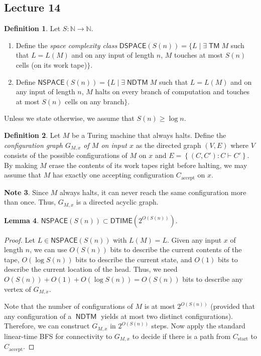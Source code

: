\documentclass[10pt,letterpaper,cm]{nupset}
\theoremstyle{definition}
\newtheorem{definition}{Definition}[subsection]
\newtheorem{note}[definition]{Note}
\theoremstyle{theorem}
\newtheorem{lemma}[definition]{Lemma}
\theoremstyle{remark}
\newcommand{\N}{\mathbb N}
\newcommand{\1}{\mathbf{1}}
\newcommand{\0}{\vec 0}
\DeclareMathOperator{\TM}{\mathsf{TM}}
\DeclareMathOperator{\NDTM}{\mathsf{NDTM}}
\begin{document}
\subsection{Lecture 14}

\begin{definition} Let $S: \N \to \N$.
\begin{enumerate}
\item Define the \textit{space complexity class} $\mathsf{DSPACE}(S(n)) = \{L \mid \exists \TM M$ such that $L = L(M)$ and on any input of length $n$, $M$ touches at most $S(n)$ cells (on its work tape)$\}$.
\item Define $\mathsf{NSPACE}(S(n)) = \{L \mid \exists \NDTM M$ such that $L = L(M)$ and on any input of length $n$, $M$ halts on every branch of computation and touches at most $S(n)$ cells on any branch$\}$.
\end{enumerate}
Unless we state otherwise, we assume that $S(n) \geq \log{n}$.
\end{definition}

\begin{definition}
Let $M$ be a Turing machine that always halts. Define the \textit{configuration graph $G_{M,x}$ of $M$ on input $x$} as the directed graph $\left(V, E\right)$ where $V$ consists of the possible configurations of $M$ on $x$ and $E = \left\{(C,C') : C \vdash C'\right\}$. By making $M$ erase the contents of its work tapes right before halting, we may assume that $M$ has exactly one accepting configuration $C_{\text{accept}}$ on $x$.
\end{definition}

\begin{note}
Since $M$ always halts, it can never reach the same configuration more than once. Thus, $G_{M,x}$ is a directed acyclic graph.  
\end{note}

\begin{lemma}
$\mathsf{NSPACE}(S(n)) \subset \mathsf{DTIME}(2^{O(S(n))})$.
\end{lemma}
\begin{proof}
Let $L \in \mathsf{NSPACE}(S(n)) $ with $L(M) = L$.  Given any input $x$ of length $n$, we can use $O(S(n))$ bits to describe the current contents of the tape, $O(\log{S(n)})$ bits to describe the current state, and $O(1)$ bits to describe the current location of the head. Thus, we need $O(S(n)) + O(1) + O(\log{S(n)})= O(S(n))$ bits to describe any vertex of $G_{M,x}$. 

\medskip


Note that the number of configurations of $M$ is at most $2^{O(S(n))}$ (provided that any configuration of a $\NDTM$ yields at most two distinct configurations).  Therefore, we can construct $G_{M,x}$ in $2^{O(S(n))}$ steps. Now apply the standard linear-time BFS for connectivity to $G_{M,x}$ to decide if there is a path from $C_{\text{start}}$ to $C_{\text{accept}}$. 
\end{proof}
\end{document}
